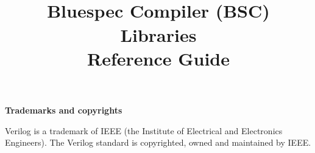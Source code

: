 \documentclass{article}
\begin{document}
\title{
\\
\vspace{0.3in}
Bluespec Compiler (BSC) \\
Libraries \\
Reference Guide \\
\vspace*{1in}
\mbox{}
}

\maketitle


\pagestyle{fancy}


\cfoot{\thepage}


\newpage

{\large\bf Trademarks and copyrights}

Verilog is a trademark of IEEE (the Institute of Electrical and
Electronics Engineers).  The Verilog standard is copyrighted, owned
and maintained by IEEE.
\end{document}
